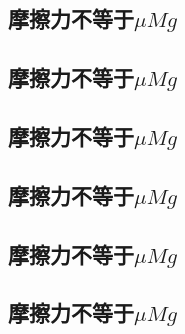 \subsection{摩擦力不等于$\mu Mg$}
\subsection{摩擦力不等于$\mu Mg$}
\subsection{摩擦力不等于$\mu Mg$}
\subsection{摩擦力不等于$\mu Mg$}
\subsection{摩擦力不等于$\mu Mg$}
\subsection{摩擦力不等于$\mu Mg$}
